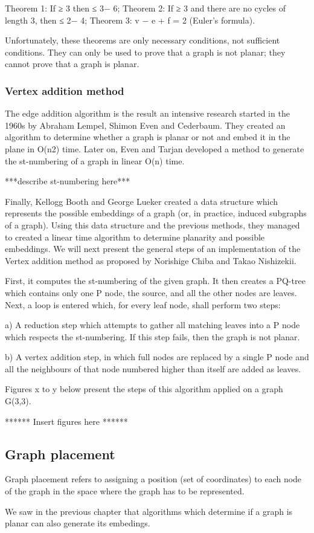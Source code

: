 Theorem 1: If \iv ≥ 3 then \ie ≤ 3\iv − 6;
Theorem 2: If \iv ≥ 3 and there are no cycles of length 3, then \ie ≤ 2\iv − 4;
Theorem 3: v − e + f = 2 (Euler's formula).

Unfortunately, these theorems are only necessary conditions, not sufficient conditions. They can only be used to 
prove that a graph is not planar; they cannot prove that a graph is planar.

\subsubsection{Vertex addition method}

The edge addition algorithm is the result an intensive research started in the 1960s by Abraham Lempel, Shimon Even
and Cederbaum. They created an algorithm to determine whether a graph is planar or not and embed it in the plane in 
O(n2) time. Later on, Even and Tarjan developed a method to generate the st-numbering of a graph in linear O(n) time.

***describe st-numbering here***

Finally, Kellogg Booth and George Lueker created a data structure which represents the possible embeddings of a graph 
(or, in practice, induced subgraphs of a graph). Using this data structure and the previous methods, they managed to 
created a linear time algorithm to determine planarity and possible embeddings. We will next present the general steps 
of an implementation of the Vertex addition method as proposed by Norishige Chiba and Takao Nishizekii.

First, it computes the st-numbering of the given graph. It then creates a PQ-tree which contains only one P node, the 
source, and all the other nodes are leaves. Next, a loop is entered which, for every leaf node, shall perform two steps:

a) A reduction step which attempts to gather all matching leaves into a P node which respects the st-numbering. If this 
step fails, then the graph is not planar.

b) A vertex addition step, in which full nodes are replaced by a single P node and all the neighbours of that node 
numbered higher than itself are added as leaves.

Figures x to y below present the steps of this algorithm applied on a graph G(3,3).

****** Insert figures here ******


\subsection{Graph placement}

Graph placement refers to assigning a position (set of coordinates) to each node of the graph in the space where 
the graph has to be represented.

We saw in the previous chapter that algorithms which determine if a graph is planar can also generate its 
embedings.

